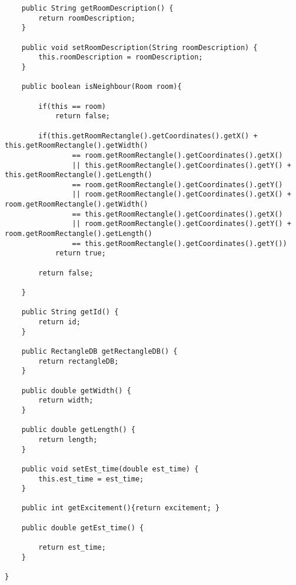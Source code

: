\documentclass{article}
\begin{document}
\begin{lstlisting}
    public String getRoomDescription() {
        return roomDescription;
    }

    public void setRoomDescription(String roomDescription) {
        this.roomDescription = roomDescription;
    }

    public boolean isNeighbour(Room room){

        if(this == room)
            return false;

        if(this.getRoomRectangle().getCoordinates().getX() + this.getRoomRectangle().getWidth()
                == room.getRoomRectangle().getCoordinates().getX()
                || this.getRoomRectangle().getCoordinates().getY() + this.getRoomRectangle().getLength()
                == room.getRoomRectangle().getCoordinates().getY()
                || room.getRoomRectangle().getCoordinates().getX() + room.getRoomRectangle().getWidth()
                == this.getRoomRectangle().getCoordinates().getX()
                || room.getRoomRectangle().getCoordinates().getY() + room.getRoomRectangle().getLength()
                == this.getRoomRectangle().getCoordinates().getY())
            return true;

        return false;

    }

    public String getId() {
        return id;
    }

    public RectangleDB getRectangleDB() {
        return rectangleDB;
    }

    public double getWidth() {
        return width;
    }

    public double getLength() {
        return length;
    }

    public void setEst_time(double est_time) {
        this.est_time = est_time;
    }

    public int getExcitement(){return excitement; }

    public double getEst_time() {

        return est_time;
    }

}
\end{lstlisting}
\newpage
\end{document}
